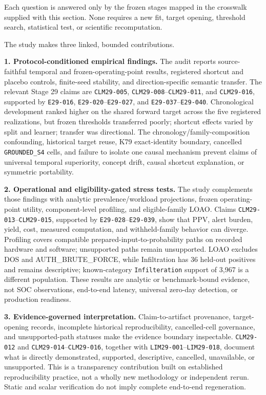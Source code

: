 \documentclass[preprint,12pt]{elsarticle}
\begin{document}
Each question is answered only by the frozen stages mapped in the crosswalk supplied with this section. None requires a new fit, target opening, threshold search, statistical test, or scientific recomputation.

The study makes three linked, bounded contributions.

\textbf{1. Protocol-conditioned empirical findings.} The audit reports source-faithful temporal and frozen-operating-point results, registered shortcut and placebo controls, finite-seed stability, and direction-specific semantic transfer. The relevant Stage 29 claims are \texttt{CLM29-005}, \texttt{CLM29-008}--\texttt{CLM29-011}, and \texttt{CLM29-016}, supported by \texttt{E29-016}, \texttt{E29-020}--\texttt{E29-027}, and \texttt{E29-037}--\texttt{E29-040}. Chronological development ranked higher on the shared forward target across the five registered realizations, but frozen thresholds transferred poorly; shortcut effects varied by split and learner; transfer was directional. The chronology/family-composition confounding, historical target reuse, K79 exact-identity boundary, cancelled \texttt{GROUNDED\_S4} cells, and failure to isolate one causal mechanism prevent claims of universal temporal superiority, concept drift, causal shortcut explanation, or symmetric portability.

\textbf{2. Operational and eligibility-gated stress tests.} The study complements those findings with analytic prevalence/workload projections, frozen operating-point utility, component-level profiling, and eligible-family LOAO. Claims \texttt{CLM29-013}--\texttt{CLM29-015}, supported by \texttt{E29-028}--\texttt{E29-039}, show that PPV, alert burden, yield, cost, measured computation, and withheld-family behavior can diverge. Profiling covers compatible prepared-input-to-probability paths on recorded hardware and software; unsupported paths remain unsupported. LOAO excludes DOS and AUTH\_BRUTE\_FORCE, while Infiltration has 36 held-out positives and remains descriptive; known-category \texttt{Infilteration} support of 3,967 is a different population. These results are analytic or benchmark-bound evidence, not SOC observations, end-to-end latency, universal zero-day detection, or production readiness.

\textbf{3. Evidence-governed interpretation.} Claim-to-artifact provenance, target-opening records, incomplete historical reproducibility, cancelled-cell governance, and unsupported-path statuses make the evidence boundary inspectable. \texttt{CLM29-012} and \texttt{CLM29-014}--\texttt{CLM29-016}, together with \texttt{LIM29-001}--\texttt{LIM29-018}, document what is directly demonstrated, supported, descriptive, cancelled, unavailable, or unsupported. This is a transparency contribution built on established reproducibility practice, not a wholly new methodology or independent rerun. Static and scalar verification do not imply complete end-to-end regeneration.
\end{document}
